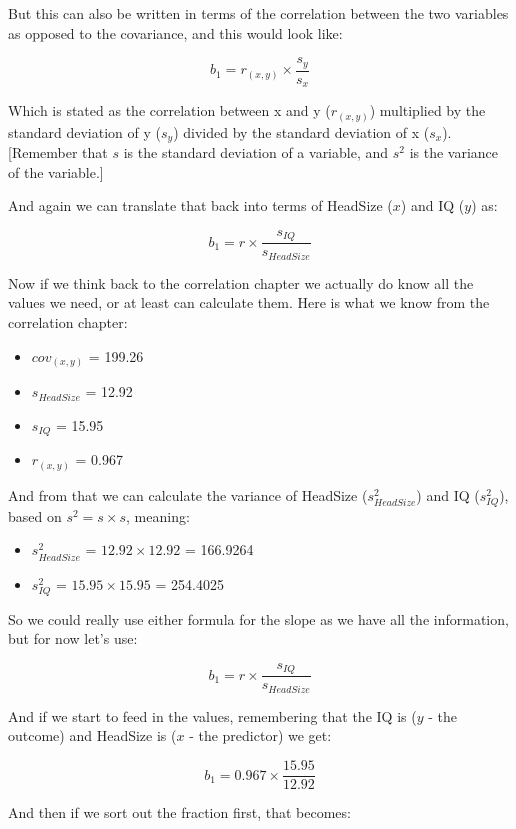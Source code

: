 \documentclass[
  oneside]{book}
\providecommand{\tightlist}{%
  \setlength{\itemsep}{0pt}\setlength{\parskip}{0pt}}
\begin{document}
But this can also be written in terms of the correlation between the two variables as opposed to the covariance, and this would look like:

\[b_{1} = r_{(x,y)} \times \frac{s_{y}}{s_{x}}\]

Which is stated as the correlation between x and y (\(r_{(x,y)}\)) multiplied by the standard deviation of y (\(s_{y}\)) divided by the standard deviation of x (\(s_{x}\)). {[}Remember that \(s\) is the standard deviation of a variable, and \(s^2\) is the variance of the variable.{]}

And again we can translate that back into terms of HeadSize (\(x\)) and IQ (\(y\)) as:

\[b_{1} = r \times \frac{s_{IQ}}{s_{HeadSize}}\]

Now if we think back to the correlation chapter we actually do know all the values we need, or at least can calculate them. Here is what we know from the correlation chapter:

\begin{itemize}
\tightlist
\item
  \(cov_{(x,y)}\) = 199.26
\item
  \(s_{HeadSize}\) = 12.92
\item
  \(s_{IQ}\) = 15.95
\item
  \(r_{(x,y)}\) = 0.967
\end{itemize}

And from that we can calculate the variance of HeadSize (\(s^2_{HeadSize}\)) and IQ (\(s^2_{IQ}\)), based on \(s^2 = s \times s\), meaning:

\begin{itemize}
\tightlist
\item
  \(s^2_{HeadSize}\) = \(12.92 \times 12.92\) = 166.9264
\item
  \(s^2_{IQ}\) = \(15.95 \times 15.95\) = 254.4025
\end{itemize}

So we could really use either formula for the slope as we have all the information, but for now let's use:

\[b_{1} = r \times \frac{s_{IQ}}{s_{HeadSize}}\]

And if we start to feed in the values, remembering that the IQ is (\(y\) - the outcome) and HeadSize is (\(x\) - the predictor) we get:

\[b_{1} = 0.967 \times \frac{15.95}{12.92}\]

And then if we sort out the fraction first, that becomes:
\end{document}

